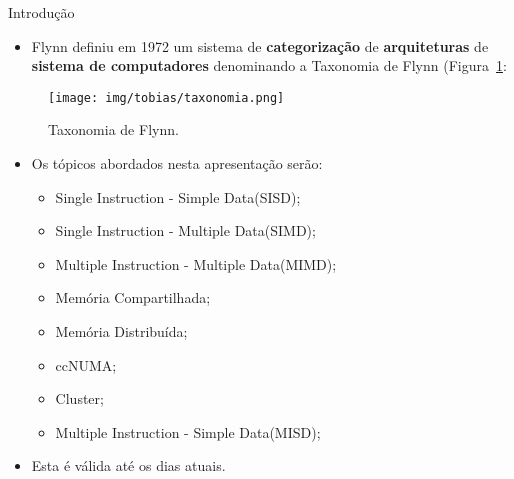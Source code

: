 




\begin{frame}{Introdução}
	\begin{itemize}
		\item Flynn \cite{flynn} definiu em 1972 um sistema de \textbf{categorização} de \textbf{arquiteturas} de \textbf{sistema de computadores} denominando a Taxonomia de Flynn (Figura~\ref{fig:taxonomia}:
	\end{itemize}

	\begin{figure}[h]
		\centering
		\texttt{[image: img/tobias/taxonomia.png]}
		\caption{Taxonomia de Flynn.}
		\label{fig:taxonomia}
	\end{figure}

	\begin{itemize}
		\item Os tópicos abordados nesta apresentação serão:
		\begin{itemize}
			\item Single Instruction - Simple Data(SISD);
			\item Single Instruction - Multiple Data(SIMD);
			\item Multiple Instruction - Multiple Data(MIMD);
			\item Memória Compartilhada;
			\item Memória Distribuída;
			\item ccNUMA;
			\item Cluster;
			\item Multiple Instruction - Simple Data(MISD);
		\end{itemize}

		\item Esta é válida até os dias atuais.
	\end{itemize}

\end{frame}








